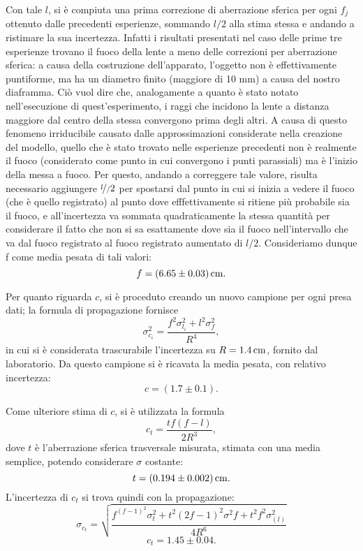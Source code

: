 Con tale $l$, si \`e compiuta una prima correzione di aberrazione sferica per ogni $f_j$ ottenuto dalle precedenti esperienze, sommando $l/2$ alla stima stessa e andando a ristimare la sua incertezza. Infatti i risultati presentati nel caso delle prime tre esperienze trovano il fuoco della lente a meno delle correzioni per aberrazione sferica: a causa della costruzione dell'apparato, l'oggetto non è effettivamente puntiforme, ma ha un diametro finito (maggiore di 10 mm) a causa del nostro diaframma. Ciò vuol dire che, analogamente a quanto è stato notato nell'esecuzione di quest'esperimento, i raggi che incidono la lente a distanza maggiore dal centro della stessa convergono prima degli altri. A causa di questo fenomeno irriducibile causato dalle approssimazioni considerate nella creazione del modello, quello che è stato trovato nelle esperienze precedenti non è realmente il fuoco (considerato come punto in cui convergono i punti parassiali) ma è l'inizio della messa a fuoco. Per questo, andando a correggere tale valore, risulta necessario aggiungere $\nicefrac l/2$ per spostarsi dal punto in cui si inizia a vedere il fuoco (che è quello registrato) al punto dove efffettivamente si ritiene più probabile sia il fuoco, e all'incertezza va sommata quadraticamente la stessa quantità per considerare il fatto che non si sa esattamente dove sia il fuoco nell'intervallo che va dal fuoco registrato al fuoco registrato aumentato di $l/2$. Consideriamo dunque f come media pesata di tali valori:
\[ f = (6.65 \pm 0.03) \,\mathrm{cm}. \] 


Per quanto riguarda $c$, si \`e proceduto creando un nuovo campione per ogni presa dati; la formula di propagazione fornisce 
\[  \sigma^2_{c_i} =\frac{f^2    \sigma^2_{l_i} + l^2    \sigma^2_{f}}{R^4}, \]
in cui si \`e considerata trascurabile l'incertezza su $R=1.4\,\mathrm{cm}$, fornito dal laboratorio.
Da questo campione si \`e ricavata la media pesata, con relativo incertezza:
\[ c = (1.7 \pm 0.1). \] 


Come ulteriore stima di $c$, si \`e utilizzata la formula
\[ c_t = \frac{t   f   (f-l)}{2R^3}, \]
dove $t$ \`e l'aberrazione sferica trasversale misurata, stimata con una media semplice, potendo considerare $\sigma$ costante:
\[ t = (0.194 \pm 0.002) \,\mathrm{cm}.\]
L'incertezza di $c_t$ si trova quindi con la propagazione: 
\[ \sigma_{c_t} = \sqrt{ \frac
{ f^   (f-1)^2    \sigma^2_{t}  +  t^2   (2f-1)^2    \sigma^2{f}  +  t^2   f^2    \sigma^2_{(l)}}
{4R^6}
}   \]
\[c_t = 1.45 \pm 0.04. \]




